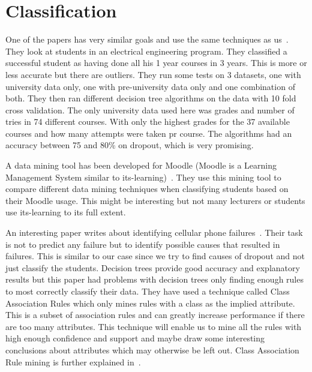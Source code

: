 \section{Classification}\label{ch:relclass}
One of the papers has very similar goals and use the same techniques as us~\cite{7}.
They look at students in an electrical engineering program. 
They classified a successful student as having done all his 1 year courses in 3 years. 
This is more or less accurate but there are outliers. 
They run some tests on 3 datasets, one with university data only, one with pre-university data only and one combination of both. 
They then ran different decision tree algorithms on the data with 10 fold cross validation. 
The only university data used here was grades and number of tries in 74 different courses. 
With only the highest grades for the 37 available courses and how many attempts were taken pr course.
The algorithms had an accuracy between 75 and 80\% on dropout, which is very promising.

\bigskip\noindent
A data mining tool has been developed for Moodle (Moodle is a Learning Management System similar to its-learning)~\cite{12}.
They use this mining tool to compare different data mining techniques when classifying students based on their Moodle usage. 
This might be interesting but not many lecturers or students use its-learning to its full extent. 

\bigskip\noindent
An interesting paper writes about identifying cellular phone failures~\cite{3}.
Their task is not to predict any failure but to identify possible causes that resulted in failures.  
This is similar to our case since we try to find causes of dropout and not just classify the students.
Decision trees provide good accuracy and explanatory results but this paper had problems with decision trees only finding enough rules to most correctly classify their data.
They have used a technique called Class Association Rules which only mines rules with a class as the implied attribute. 
This is a subset of association rules and can greatly increase performance if there are too many attributes.
This technique will enable us to mine all the rules with high enough confidence and support and maybe draw some interesting conclusions about attributes which may otherwise be left out.
Class Association Rule mining is further explained in~\cite{4}.

